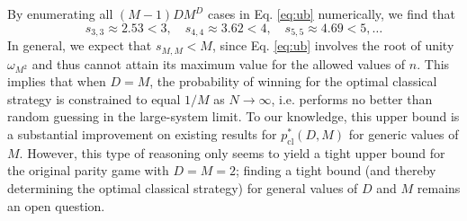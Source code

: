 \documentclass[prb,twocolumn,showpacs,amssymb,superscriptaddress]{revtex4-2}
\begin{document}
By enumerating all $(M-1)DM^D$ cases in Eq. \eqref{eq:ub} numerically, we find that
\begin{equation}
s_{3,3} \approx 2.53 < 3, \quad s_{4,4} \approx 3.62 < 4, \quad s_{5,5} \approx 4.69 < 5, \ldots
\end{equation}
In general, we expect that $s_{M,M}<M$, since Eq. \eqref{eq:ub} involves the root of unity $\omega_{M^2}$ and thus cannot attain its maximum value for the allowed values of $n$. This implies that when $D=M$, the probability of winning for the optimal classical strategy is constrained to equal $1/M$ as $N \to \infty$, i.e. performs no better than random guessing in the large-system limit. To our knowledge, this upper bound is a substantial improvement on existing results\cite{boyer2004extended} for $p^*_{\mathrm{cl}}(D,M)$ for generic values of $M$. However, this type of reasoning only seems to yield a tight upper bound for the original parity game with $D=M=2$; finding a tight bound (and thereby determining the optimal classical strategy) for general values of $D$ and $M$ remains an open question.

% 
\end{document}
